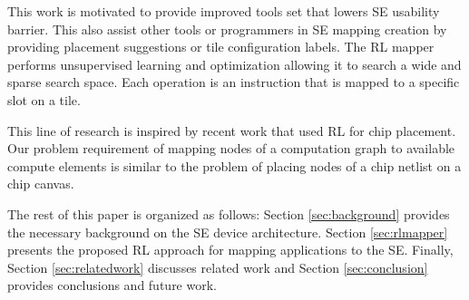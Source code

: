 This work is motivated to provide improved tools set that lowers SE usability barrier.
This also assist other tools or programmers in SE mapping creation by providing placement suggestions or tile configuration labels.
The RL mapper performs unsupervised learning and optimization allowing it to search a wide and sparse search space. 
Each operation is an instruction that is mapped to a specific slot on a tile.

This line of research is inspired by recent work that used RL for chip placement.
Our problem requirement of mapping nodes of a computation graph to available compute elements is similar to the problem of placing nodes of a chip netlist on a chip canvas. 


The rest of this paper is organized as follows: Section \ref{sec:background} provides the necessary background on the SE device architecture.
Section \ref{sec:rlmapper} presents the proposed RL approach for mapping applications to the SE.
Finally, Section \ref{sec:relatedwork} discusses related work and Section \ref{sec:conclusion} provides conclusions and future work.